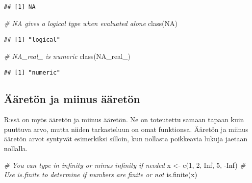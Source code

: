 \documentclass[
]{book}
\newenvironment{Shaded}{\begin{snugshade}}{\end{snugshade}}
\newcommand{\CommentTok}[1]{\textcolor[rgb]{0.56,0.35,0.01}{\textit{#1}}}
\newcommand{\ConstantTok}[1]{\textcolor[rgb]{0.00,0.00,0.00}{#1}}
\newcommand{\DecValTok}[1]{\textcolor[rgb]{0.00,0.00,0.81}{#1}}
\newcommand{\FunctionTok}[1]{\textcolor[rgb]{0.00,0.00,0.00}{#1}}
\newcommand{\NormalTok}[1]{#1}
\newcommand{\OtherTok}[1]{\textcolor[rgb]{0.56,0.35,0.01}{#1}}
\newcommand{\SpecialCharTok}[1]{\textcolor[rgb]{0.00,0.00,0.00}{#1}}
\begin{document}
\begin{verbatim}
## [1] NA
\end{verbatim}

\begin{Shaded}
\begin{Highlighting}[]
\CommentTok{\# NA gives a logical type when evaluated alone}
\FunctionTok{class}\NormalTok{(}\ConstantTok{NA}\NormalTok{)}
\end{Highlighting}
\end{Shaded}

\begin{verbatim}
## [1] "logical"
\end{verbatim}

\begin{Shaded}
\begin{Highlighting}[]
\CommentTok{\# NA\_real\_ is numeric}
\FunctionTok{class}\NormalTok{(}\ConstantTok{NA\_real\_}\NormalTok{)}
\end{Highlighting}
\end{Shaded}

\begin{verbatim}
## [1] "numeric"
\end{verbatim}

\hypertarget{uxe4uxe4retuxf6n-ja-miinus-uxe4uxe4retuxf6n}{%
\subsection{Ääretön ja miinus ääretön}\label{uxe4uxe4retuxf6n-ja-miinus-uxe4uxe4retuxf6n}}

R:ssä on myös ääretön ja miinus ääretön. Ne on toteutettu samaan tapaan kuin puuttuva arvo, mutta niiden tarkasteluun on omat funktionsa. Ääretön ja miinus ääretön arvot syntyvät esimerkiksi silloin, kun nollasta poikkeavia lukuja jaetaan nollalla.

\begin{Shaded}
\begin{Highlighting}[]
\CommentTok{\# You can type in infinity or minus infinity if needed}
\NormalTok{x }\OtherTok{\textless{}{-}} \FunctionTok{c}\NormalTok{(}\DecValTok{1}\NormalTok{, }\DecValTok{2}\NormalTok{, }\ConstantTok{Inf}\NormalTok{, }\DecValTok{5}\NormalTok{, }\SpecialCharTok{{-}}\ConstantTok{Inf}\NormalTok{)}
\CommentTok{\# Use is.finite to determine if numbers are finite or not}
\FunctionTok{is.finite}\NormalTok{(x)}
\end{Highlighting}
\end{Shaded}
\end{document}
